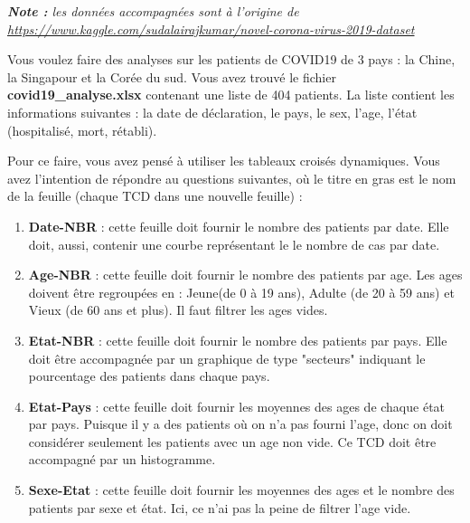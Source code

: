 \documentclass[11pt, a4paper]{article}
\begin{document}
\textit{\textbf{Note : } les données accompagnées sont à l'origine de \url{https://www.kaggle.com/sudalairajkumar/novel-corona-virus-2019-dataset}}

Vous voulez faire des analyses sur les patients de COVID19 de 3 pays : la Chine, la Singapour et la Corée du sud.
Vous avez trouvé le fichier \textbf{covid19\_analyse.xlsx} contenant une liste de 404 patients. 
La liste contient les informations suivantes : la date de déclaration, le pays, le sex, l'age, l'état (hospitalisé, mort, rétabli).

Pour ce faire, vous avez pensé à utiliser les tableaux croisés dynamiques. 
Vous avez l'intention de répondre au questions suivantes, où le titre en gras est le nom de la feuille (chaque TCD dans une nouvelle feuille) : 

\begin{enumerate}
	\item \textbf{Date-NBR} : cette feuille doit fournir le nombre des patients par date. Elle doit, aussi, contenir une courbe représentant le le nombre de cas par date. 
	\item \textbf{Age-NBR} : cette feuille doit fournir le nombre des patients par age. Les ages doivent être regroupées en : Jeune(de 0 à 19 ans), Adulte (de 20 à 59 ans) et Vieux (de 60 ans et plus). Il faut filtrer les ages vides.
	\item \textbf{Etat-NBR} : cette feuille doit fournir le nombre des patients par pays. Elle doit être accompagnée par un graphique de type "secteurs" indiquant le pourcentage des patients dans chaque pays.
	\item \textbf{Etat-Pays} : cette feuille doit fournir les moyennes des ages de chaque état par pays. Puisque il y a des patients où on n'a pas fourni l'age, donc on doit considérer seulement les patients avec un age non vide.
	Ce TCD doit être accompagné par un histogramme. 
	\item \textbf{Sexe-Etat} : cette feuille doit fournir les moyennes des ages et le nombre des patients par sexe et état. Ici, ce n'ai pas la peine de filtrer l'age vide.
\end{enumerate}
\end{document}
